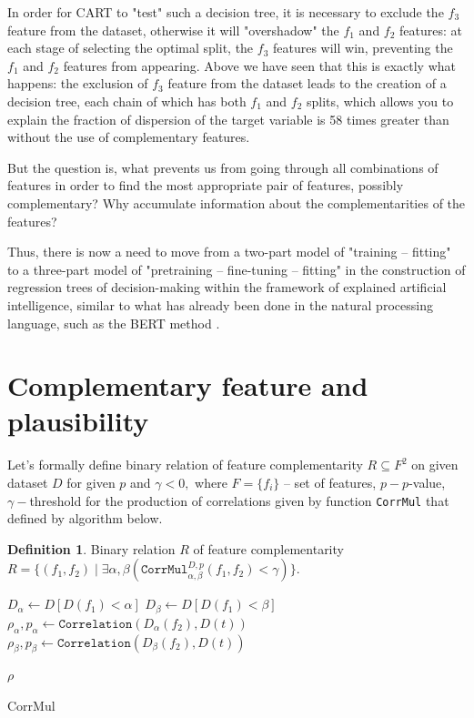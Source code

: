\documentclass[conference]{IEEEtran}
\theoremstyle{definition}
\newtheorem{definition}{Definition}[section]
\begin{document}
In order for CART to "test" such a decision tree, it is necessary to exclude the $f_3$ feature from the dataset, otherwise it will "overshadow" the $f_1$ and $f_2$ features: at each stage of selecting the optimal split, the $f_3$ features will win, preventing the $f_1$ and $f_2$ features from appearing. Above we have seen that this is exactly what happens: the exclusion of $f_3$ feature from the dataset leads to the creation of a decision tree, each chain of which has both $f_1$ and $f_2$ splits, which allows you to explain the fraction of dispersion of the target variable is 58 times greater than without the use of complementary features.


But the question is, what prevents us from going through all combinations of features in order to find the most appropriate pair of features, possibly complementary? Why accumulate information about the complementarities of the features?


Thus, there is now a need to move from a two-part model of "training -- fitting" to a three-part model of "pretraining -- fine-tuning -- fitting" in the construction of regression trees of decision-making within the framework of explained artificial intelligence, similar to what has already been done in the natural processing language, such as the BERT method \cite{BERT}.

\section{Complementary feature and plausibility}

Let's formally define binary relation of feature complementarity $R \subseteq F^2$ on given dataset $D$ for given $p$ and $\gamma < 0,$   where $F = \{f_i\}$  -- set of features, $p - p$-value, $\gamma - $threshold for the production of correlations given by function \texttt{CorrMul} that defined by algorithm below. 
\theoremstyle{definition}
\begin{definition}{Binary relation $R$ of feature complementarity $R = \{(f_1, f_2) \mid \exists\alpha,\beta(\texttt{CorrMul}_{\alpha,\beta}^{D,p}(f_1, f_2) < \gamma)\} $.
}
\end{definition}

\begin{algorithm}
\SetAlgoLined
{}

$D_{\alpha} \gets D[D(f_1) < \alpha]$\;
$D_{\beta} \gets D[D(f_1) < \beta]$\;
$\rho_{\alpha}, p_{\alpha} \gets \texttt{Correlation}(D_{\alpha}(f_2), D(t)) $\;
$\rho_{\beta}, p_{\beta} \gets \texttt{Correlation}(D_{\beta}(f_2), D(t)) $\;

 \Return $\rho$
 \caption{CorrMul}
\end{algorithm}
\end{document}
